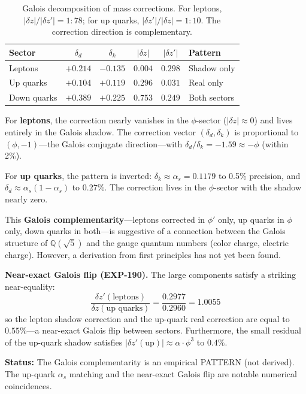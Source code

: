 \documentclass[12pt,a4paper]{article}
\begin{document}
\begin{table}[H]
\centering
\begin{tabular}{lccccl}
\toprule
\textbf{Sector} & $\delta_d$ & $\delta_k$ & $|\delta z|$ & $|\delta z'|$ & \textbf{Pattern} \\
\midrule
Leptons & $+0.214$ & $-0.135$ & $0.004$ & $0.298$ & Shadow only \\
Up quarks & $+0.104$ & $+0.119$ & $0.296$ & $0.031$ & Real only \\
Down quarks & $+0.389$ & $+0.225$ & $0.753$ & $0.249$ & Both sectors \\
\bottomrule
\end{tabular}
\caption{Galois decomposition of mass corrections. For leptons, $|\delta z| / |\delta z'| = 1:78$; for up quarks, $|\delta z'| / |\delta z| = 1:10$. The correction direction is complementary.}
\end{table}

For \textbf{leptons}, the correction nearly vanishes in the $\phi$-sector ($|\delta z| \approx 0$) and lives entirely in the Galois shadow. The correction vector $(\delta_d, \delta_k)$ is proportional to $(\phi, -1)$---the Galois conjugate direction---with $\delta_d / \delta_k = -1.59 \approx -\phi$ (within 2\%).

For \textbf{up quarks}, the pattern is inverted: $\delta_k \approx \alpha_s = 0.1179$ to 0.5\% precision, and $\delta_d \approx \alpha_s(1 - \alpha_s)$ to 0.27\%. The correction lives in the $\phi$-sector with the shadow nearly zero.

This \textbf{Galois complementarity}---leptons corrected in $\phi'$ only, up quarks in $\phi$ only, down quarks in both---is suggestive of a connection between the Galois structure of $\mathbb{Q}(\sqrt{5})$ and the gauge quantum numbers (color charge, electric charge). However, a derivation from first principles has not yet been found.

\textbf{Near-exact Galois flip (EXP-190).} The large components satisfy a striking near-equality:
\begin{equation}
\frac{\delta z'(\text{leptons})}{\delta z(\text{up quarks})} = \frac{0.2977}{0.2960} = 1.0055
\end{equation}
so the lepton shadow correction and the up-quark real correction are equal to $0.55\%$---a near-exact Galois flip between sectors. Furthermore, the small residual of the up-quark shadow satisfies $|\delta z'(\text{up})| \approx \alpha \cdot \phi^3$ to $0.4\%$.

\textbf{Status:} The Galois complementarity is an empirical PATTERN (not derived). The up-quark $\alpha_s$ matching and the near-exact Galois flip are notable numerical coincidences.
\end{document}
